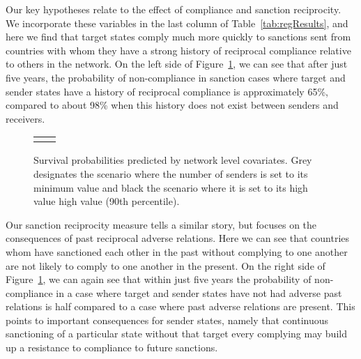 


Our key hypotheses relate to the effect of compliance and sanction reciprocity. We incorporate these variables in the last column of Table~\ref{tab:regResults}, and here we find that target states comply much more quickly to sanctions sent from countries with whom they have a strong history of reciprocal compliance relative to others in the network. On the left side of Figure~\ref{fig:surv3}, we can see that after just five years, the probability of non-compliance in sanction cases where target and sender states have a history of reciprocal compliance is approximately 65\%, compared to about 98\% when this history does not exist between senders and receivers. 

\begin{figure}[ht]
	\centering
	\caption{Survival probabilities predicted by network level covariates. Grey designates the scenario where the number of senders is set to its minimum value and black the scenario where it is set to its high value high value (90th percentile).}
	\begin{tabular}{cc}

	\subfloat[Subfigure 1][Compliance Reciprocity]{
		\resizebox{.45\textwidth}{!}{}
		\label{fig:compSancSurv}} & 
	
	\subfloat[Subfigure 2][Sanction Reciprocity]{
		\resizebox{.45\textwidth}{!}{}
		\label{fig:compSancSurv}}	

	\end{tabular}

	\label{fig:surv3}	
\end{figure}


Our sanction reciprocity measure tells a similar story, but focuses on the consequences of past reciprocal adverse relations. Here we can see that countries whom have sanctioned each other in the past without complying to one another are not likely to comply to one another in the present. On the right side of Figure~\ref{fig:surv3}, we can again see that within just five years the probability of non-compliance in a case where target and sender states have not had adverse past relations is half compared to a case where past adverse relations are present. This points to important consequences for sender states, namely that continuous sanctioning of a particular state without that target every complying  may build up a resistance to compliance to future sanctions. 

